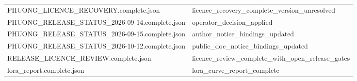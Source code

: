 \begin{longtable}{>{\raggedright\arraybackslash}p{.49\linewidth}>{\raggedright\arraybackslash}p{.44\linewidth}}
PHUONG\_\allowbreak{}LICENCE\_\allowbreak{}RECOVERY.complete.json & %
licence\_\allowbreak{}recovery\_\allowbreak{}complete\_\allowbreak{}version\_\allowbreak{}unresolved \\ %

PHUONG\_\allowbreak{}RELEASE\_\allowbreak{}STATUS\_\allowbreak{}2026-09-14.complete.json & %
operator\_\allowbreak{}decision\_\allowbreak{}applied \\ %

PHUONG\_\allowbreak{}RELEASE\_\allowbreak{}STATUS\_\allowbreak{}2026-09-15.complete.json & %
author\_\allowbreak{}notice\_\allowbreak{}bindings\_\allowbreak{}updated \\ %

PHUONG\_\allowbreak{}RELEASE\_\allowbreak{}STATUS\_\allowbreak{}2026-10-12.complete.json & %
public\_\allowbreak{}doc\_\allowbreak{}notice\_\allowbreak{}bindings\_\allowbreak{}updated \\ %

RELEASE\_\allowbreak{}LICENCE\_\allowbreak{}REVIEW.complete.json & %
licence\_\allowbreak{}review\_\allowbreak{}complete\_\allowbreak{}with\_\allowbreak{}open\_\allowbreak{}release\_\allowbreak{}gates \\ %

lora\_\allowbreak{}report.complete.json & %
lora\_\allowbreak{}curve\_\allowbreak{}report\_\allowbreak{}complete \\ %


\end{longtable}
